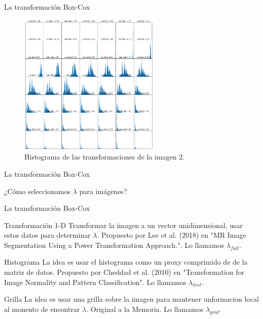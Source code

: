 \documentclass{beamer}
\begin{document}
\begin{frame}{La transformación Box-Cox}
    \begin{figure}
        \centering
        \includegraphics[width=0.6\textwidth]{all_lambda_hist_3.png}
        \caption{Histograma de las transformaciones de la imagen 2.}
        \label{fig:img_bci_hist_2}
    \end{figure}
\end{frame}

\begin{frame}{La transformación Box-Cox}
    \begin{center}
        {\Large ¿Cómo seleccionamos $\lambda$ para imágenes?}
    \end{center}
\end{frame}

\begin{frame}{La transformación Box-Cox}
    \begin{block}{Transformación 1-D}
        Transformar la imagen a un vector unidimensional, usar estos datos para determinar $\lambda$. Propuesto por Lee et al. (2018) en "MR Image Segmentation Using a Power Transformation Approach.". Lo llamamos $\lambda_{full}$.
    \end{block}
    
    \pause
    \begin{block}{Histograma}
        La idea es usar el histograma como un proxy comprimido de de la matriz de datos. Propuesto por Cheddad et al. (2010) en "Transformation for Image Normality and Pattern Classification". Lo llamamos $\lambda_{hist}$.
    \end{block}
    
    \pause
    \begin{block}{Grilla}
        La idea es usar una grilla sobre la imagen para mantener unformacion local al monento de encontrar $\lambda$. Original a la Memoria. Lo llamamos $\lambda_{grid}$.
    \end{block}

\end{frame}
\end{document}
